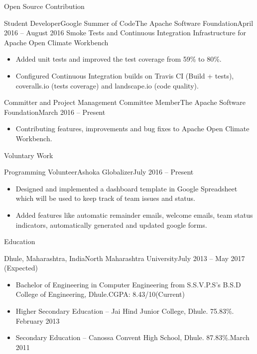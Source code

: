 \documentclass[]{mcdowellcv}
\begin{document}
	\makeheader
	
	\begin{cvsection}{Open Source Contribution}
		\begin{cvsubsection}[2]{Student Developer\linebreak Google Summer of Code}{The Apache Software Foundation}{April 2016 -- August 2016}
			Smoke Tests and Continuous Integration Infrastructure for Apache Open Climate Workbench
			\begin{itemize}
				\item Added unit tests and improved the test coverage from 59\% to 80\%.
				\item Configured Continuous Integration builds on Travis CI (Build + tests), coveralls.io (tests coverage) and landscape.io (code quality).
			\end{itemize}
		\end{cvsubsection}
		
		\begin{cvsubsection}[2]{Committer and Project Management Committee Member}{The Apache Software Foundation}{March 2016 -- Present}
			\begin{itemize}
				\item Contributing features, improvements and bug fixes to Apache Open Climate Workbench.
			\end{itemize}
		\end{cvsubsection}
	\end{cvsection}
	\begin{cvsection}{Voluntary Work}
		\begin{cvsubsection}{Programming Volunteer}{Ashoka Globalizer}{July 2016 -- Present}
			\begin{itemize}
				\item Designed and implemented a dashboard template in Google Spreadsheet which will be used to keep track of team issues and status.
				\item Added features like automatic remainder emails, welcome emails, team status indicators, automatically generated and updated google forms.
			\end{itemize}
		\end{cvsubsection}
	\end{cvsection}
	
	\begin{cvsection}{Education}
		\begin{cvsubsection}{Dhule, Maharashtra, India}{North Maharashtra University}{July 2013 -- May 2017 (Expected)}
			\begin{itemize}
				\item Bachelor of Engineering in Computer Engineering from S.S.V.P.S's B.S.D College of Engineering, Dhule.\linebreak CGPA: 8.43/10(Current)
				\item Higher Secondary Education -- Jai Hind Junior College, Dhule. 75.83\%. \hfill February 2013
				\item Secondary Education -- Canossa Convent High School, Dhule. 87.83\%.\hfill March 2011
			\end{itemize}
		\end{cvsubsection}
	\end{cvsection}
	
\end{document}
